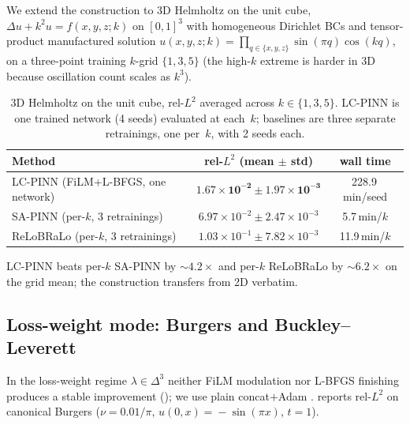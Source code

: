 We extend the construction to 3D Helmholtz on the unit cube,
$\Delta u + k^2 u = f(x,y,z;k)$ on $[0,1]^3$ with homogeneous
Dirichlet BCs and tensor-product manufactured solution
$u(x,y,z;k) \!=\! \prod_{q\in\{x,y,z\}}\sin(\pi q)\cos(kq)$, on a
three-point training $k$-grid $\{1, 3, 5\}$ (the high-$k$ extreme
is harder in 3D because oscillation count scales as $k^3$).

\begin{table}[h]
\centering
\caption{3D Helmholtz on the unit cube, rel-$L^2$ averaged across
$k \in \{1, 3, 5\}$. LC-PINN is one trained network (4 seeds)
evaluated at each~$k$; baselines are three separate retrainings,
one per~$k$, with 2 seeds each.}
\label{tab:helmholtz-3d}
\begin{tabular}{lcc}
\toprule
Method & rel-$L^2$ (mean $\pm$ std) & wall time \\
\midrule
LC-PINN (FiLM+L-BFGS, one network) & $\mathbf{1.67 \times 10^{-2} \pm 1.97 \times 10^{-3}}$ & 228.9\,min/seed \\
SA-PINN (per-$k$, 3 retrainings)   & $6.97 \times 10^{-2} \pm 2.47 \times 10^{-3}$ & 5.7\,min/$k$ \\
ReLoBRaLo (per-$k$, 3 retrainings) & $1.03 \times 10^{-1} \pm 7.82 \times 10^{-3}$ & 11.9\,min/$k$ \\
\bottomrule
\end{tabular}
\end{table}

LC-PINN beats per-$k$ SA-PINN by $\sim\!4.2\times$ and per-$k$
ReLoBRaLo by $\sim\!6.2\times$ on the grid mean; the construction
transfers from 2D verbatim.

\subsection{Loss-weight mode: Burgers and Buckley--Leverett}
\label{sec:results-burgers-bl}

In the loss-weight regime $\lambda \!\in\! \Delta^3$ neither FiLM
modulation nor L-BFGS finishing produces a stable improvement
(); we use plain concat$+$Adam
\citep{dosovitskiy2020}.  reports rel-$L^2$ on
canonical Burgers ($\nu \!=\! 0.01/\pi$, $u(0,x)\!=\!-\sin(\pi x)$,
$t\!=\!1$).

